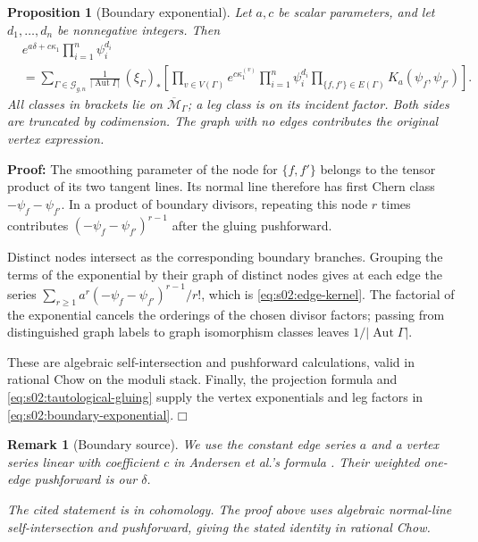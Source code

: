 \documentclass[a4paper,10pt]{article}
\numberwithin{equation}{section}
\newcommand{\MM}{\overline{\mathcal{M}}}
\theoremstyle{paperplain}
\newtheorem{prp}[thm]{Proposition}
\theoremstyle{paperremark}
\newtheorem{rmk}{Remark}[section]
\theoremstyle{paperplain}
\newenvironment{prf}{\noindent \textbf{Proof: }}{\hfill $\mdlgwhtsquare$\par\addvspace{0.5\baselineskip}}
\begin{document}
\begin{prp}[Boundary exponential]
\label{prp:s02:boundary-exponential}
Let $a,c$ be scalar parameters, and let $d_1,\ldots,d_n$ be
nonnegative integers.  Then
\begin{equation}
\label{eq:s02:boundary-exponential}
\begin{split}
&e^{a\delta+c\kappa_1}\prod_{i=1}^n\psi_i^{d_i}\\
&=\sum_{\Gamma\in\mathcal G_{g,n}}
\frac{1}{|\operatorname{Aut}\Gamma|}\,
(\xi_\Gamma)_*\left[
\prod_{v\in V(\Gamma)}e^{c\kappa_1^{(v)}}
\prod_{i=1}^n\psi_i^{d_i}
\prod_{\{f,f'\}\in E(\Gamma)}K_a(\psi_f,\psi_{f'})
\right].
\end{split}
\end{equation}
All classes in brackets lie on $\MM_\Gamma$; a leg class is on its
incident factor.  Both sides are truncated by codimension.  The graph
with no edges contributes the original vertex expression.
\end{prp}

\begin{prf}
The smoothing parameter of the node for $\{f,f'\}$ belongs to the
tensor product of its two tangent lines.  Its normal line therefore
has first Chern class $-\psi_f-\psi_{f'}$.  In a product of boundary
divisors, repeating this node $r$ times contributes
$(-\psi_f-\psi_{f'})^{r-1}$ after the gluing pushforward.

\smallskip\noindent Distinct nodes intersect as the corresponding boundary branches.
Grouping the terms of the exponential by their graph of distinct
nodes gives at each edge the series
$\sum_{r\geq1}a^r(-\psi_f-\psi_{f'})^{r-1}/r!$, which is
\eqref{eq:s02:edge-kernel}.  The factorial of the exponential cancels
the orderings of the chosen divisor factors; passing from distinguished
graph labels to graph isomorphism classes leaves
$1/|\operatorname{Aut}\Gamma|$.

\smallskip\noindent These are algebraic self-intersection and pushforward calculations,
valid in rational Chow on the moduli stack.  Finally, the projection
formula and \eqref{eq:s02:tautological-gluing} supply the vertex
exponentials and leg factors in \eqref{eq:s02:boundary-exponential}.
\end{prf}

\begin{rmk}[Boundary source]
\label{rmk:s02:boundary-source}
We use the constant edge series $a$ and a vertex series linear with
coefficient $c$ in Andersen et al.'s formula
\cite[Lemma 3.10, (3.18)--(3.22)]{ABCDGLW23}.
Their weighted one-edge pushforward is our $\delta$.

The cited statement is in cohomology.  The proof above uses algebraic
normal-line self-intersection and pushforward, giving the stated
identity in rational Chow.
\end{rmk}
\end{document}
